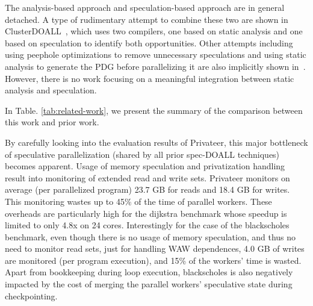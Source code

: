 

The analysis-based approach and speculation-based approach are in general
detached. A type of rudimentary attempt to combine these two are shown in
ClusterDOALL~\cite{kim:12:cgo}, which uses two compilers, one based on static
analysis and one based on speculation to identify both opportunities. Other
attempts including using peephole optimizations to remove unnecessary
speculations and using static analysis to generate the PDG before parallelizing
it are also implicitly shown in~\cite{johnson:12:pldi,ctian:2008:micro}.
However, there is no work focusing on a meaningful integration between static
analysis and speculation.

In Table. \ref{tab:related-work}, we present the summary of the comparison
between this work and prior work.






By carefully looking into the evaluation results of Privateer, this major
bottleneck of speculative parallelization (shared by all prior spec-DOALL
techniques) becomes apparent.
%
Usage of memory speculation and privatization handling result into monitoring of
extended read and write sets.
%
Privateer monitors on average (per parallelized program) 23.7 GB for reads and
18.4 GB for writes.  This monitoring wastes up to 45\% of the time of parallel
workers.
%
These overheads are particularly high for the dijkstra benchmark whose speedup
is limited to only 4.8x on 24 cores.
%
Interestingly for the case of the blackscholes benchmark, even though there is
no usage of memory speculation, and thus no need to monitor read sets, just for
handling WAW dependences, 4.0 GB of writes are monitored (per program
execution), and 15\% of the workers' time is wasted.
%
Apart from bookkeeping during loop execution, blackscholes is also negatively
impacted by the cost of merging the parallel workers' speculative state during
checkpointing.

